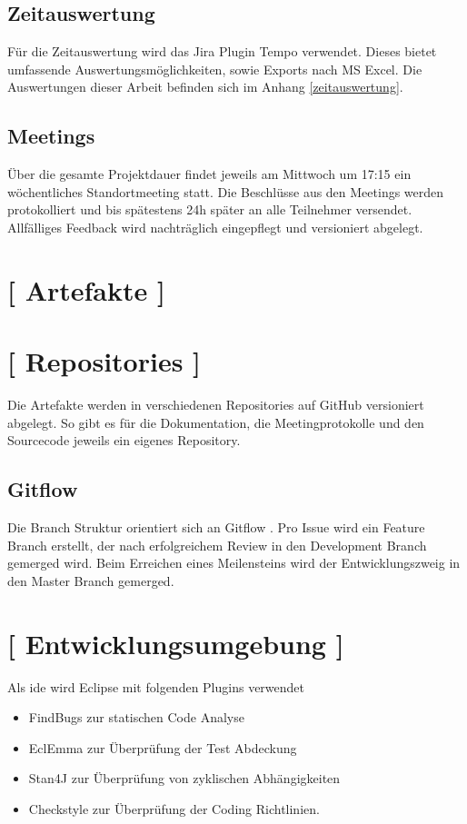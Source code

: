 \documentclass[11pt,a4paper,english,oneside]{book}
\numberwithin{equation}{chapter}
\begin{document}
	\subsection{Zeitauswertung}
	Für die Zeitauswertung wird das Jira Plugin Tempo \cite{jiratempo} verwendet. Dieses bietet umfassende Auswertungsmöglichkeiten, sowie Exports nach MS Excel. Die Auswertungen dieser Arbeit befinden sich im Anhang \ref{zeitauswertung}.
	
	\subsection{Meetings}
	Über die gesamte Projektdauer findet jeweils am Mittwoch um 17:15 ein wöchentliches Standortmeeting statt. Die Beschlüsse aus den Meetings werden protokolliert und bis spätestens 24h später an alle Teilnehmer versendet. Allfälliges Feedback wird nachträglich eingepflegt und versioniert abgelegt.
	

	
	\section{ [ Artefakte ] }
	
	\section{ [ Repositories ] }
	Die Artefakte werden in verschiedenen Repositories auf GitHub versioniert abgelegt. So gibt es für die Dokumentation, die Meetingprotokolle und den Sourcecode jeweils ein eigenes Repository.
	
	\subsection{Gitflow}
	Die Branch Struktur orientiert sich an Gitflow \cite{gitflow}. Pro Issue wird ein Feature Branch erstellt, der nach erfolgreichem Review in den Development Branch gemerged wird. Beim Erreichen eines Meilensteins wird der Entwicklungszweig in den Master Branch gemerged.
	
	\section{ [ Entwicklungsumgebung ] }
	Als \gls{ide} wird Eclipse mit folgenden Plugins verwendet
	\begin{itemize}
		\item FindBugs \cite{findbugs} zur statischen Code Analyse
		\item EclEmma \cite{eclemma} zur Überprüfung der Test Abdeckung
		\item Stan4J \cite{stan4j} zur Überprüfung von zyklischen Abhängigkeiten
		\item Checkstyle \cite{checkstyle} zur Überprüfung der Coding Richtlinien.
	\end{itemize}
\end{document}
